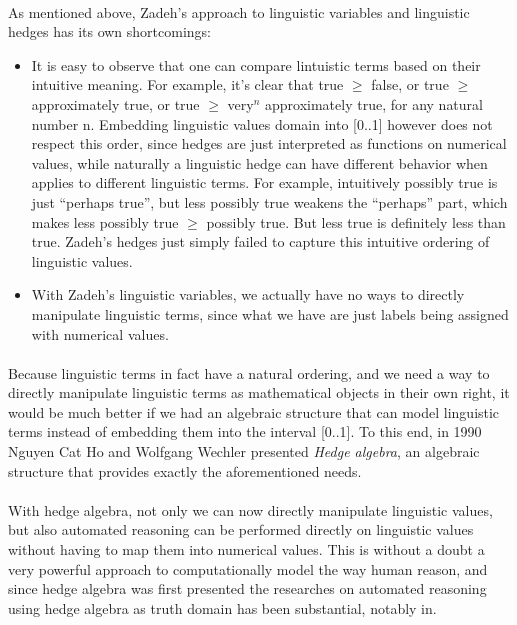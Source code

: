\documentclass[../gr-final.tex]{subfiles}
\begin{document}
\paragraph{} As mentioned above, Zadeh's approach to linguistic
variables and linguistic hedges has its own shortcomings:
\begin{itemize}
        \item It is easy to observe that one can compare
                lintuistic terms based on their intuitive meaning. For
                example, it's clear that true $\ge$ false, or
                true $\ge$ approximately true, or true $\ge$
                very$^n$ approximately true, for any natural
                number n. Embedding linguistic values domain into
                [0..1] however does not respect this order, since
                hedges are just interpreted as functions on
                numerical values, while naturally a linguistic
                hedge can have different behavior when applies to
                different linguistic terms. For example, intuitively
                possibly true is just ``perhaps true'', but less
                possibly true weakens the ``perhaps'' part, which
                makes less possibly true $\ge$ possibly true. But
                less true is definitely less than true. Zadeh's
                hedges just simply failed to capture this
                intuitive ordering of linguistic values.
        \item With Zadeh's linguistic variables, we actually have
                no ways to directly manipulate linguistic terms,
                since what we have are just labels being assigned
                with numerical values.                                 
\end{itemize}
\paragraph{} Because linguistic terms in fact have a natural ordering, and we
need a way to directly manipulate linguistic terms as
mathematical objects in their own right, it would be much better
if we had an algebraic structure that can model linguistic terms
instead of embedding them into the interval [0..1]. To this end,
in 1990 Nguyen Cat Ho and Wolfgang Wechler
presented {\em Hedge algebra}, an algebraic structure
that provides exactly the aforementioned needs.
\paragraph{} With hedge algebra, not only we can now directly manipulate
linguistic values, but also automated reasoning can be performed
directly on linguistic values without having to map them into
numerical values. This is without a doubt a very powerful approach 
to computationally model the way human reason, and since hedge
algebra was first presented the researches on automated reasoning
using hedge algebra as truth domain has been substantial, notably
in.
\end{document}
